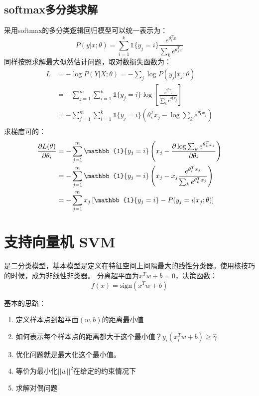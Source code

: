 \subsection{softmax多分类求解}
采用softmax的多分类逻辑回归模型可以统一表示为：
\begin{equation*}
    P(y|x;\theta) = \sum_{i=1}^k \mathbb{1}\{ y_j=i \} \frac{e^{\theta_i^T x}}{\sum_k e^{\theta_k^T x}}
\end{equation*}
同样按照求解最大似然估计问题，取对数损失函数为：
\begin{align*}
    L &= -\log P(Y|X;\theta) = -\sum_j \log P(y_j|x_j;\theta) \\
    &= -\sum_{j=1}^{m} \sum_{i=1}^k \mathbb{1}\{ y_j=i \} \log \left[\frac{e^{\theta_i^T x_j}}{\sum_k e^{\theta_k^T x_j}} \right] \\
    &= -\sum_{j=1}^{m} \sum_{i=1}^k \mathbb{1}\{ y_j=i \} \left( \theta_i^T x_j - \log \sum_k e^{\theta_k^T x_j} \right)\\
\end{align*}
求梯度可的：
\begin{align*}
    \Q{L(\theta)}{\theta_i} &= -\sum_{j=1}^{m} \mathbb{1}\{ y_j=i \} \left(x_j - \Q{\log \sum_k e^{\theta_k^T x_j}}{\theta_i} \right)\\
    &= -\sum_{j=1}^{m} \mathbb{1}\{ y_j=i \} \left(x_j - x_j \frac{e^{\theta_i^T x_j}}{\sum_k e^{\theta_k^T x_j}} \right)\\
    &= -\sum_{j=1}^{m} x_j \left[ \mathbb{1}\{ y_j=i \} - P(y_j=i|x_j;\theta) \right]
\end{align*}


\section{支持向量机 SVM}
是二分类模型，基本模型是定义在特征空间上间隔最大的线性分类器。使用核技巧的时候，成为非线性非类器。
分离超平面为$x^T w + b = 0$，决策函数：
\begin{equation*}
    f(x) = \text{sign}(x^T w + b)
\end{equation*}

基本的思路：
\begin{enumerate}
\item 定义样本点到超平面$(w,b)$的距离最小值
\item 如何表示每个样本点的距离都大于这个最小值？$y_i(x_i^T w + b) \ge \hat{\gamma}$
\item 优化问题就是最大化这个最小值。
\item 等价为最小化$||w||^2$在给定的约束情况下
\item 求解对偶问题
\end{enumerate}


